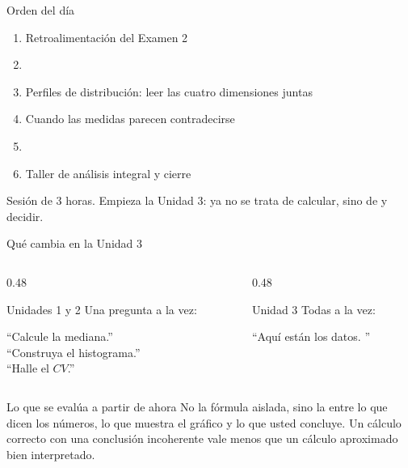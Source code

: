 \documentclass[aspectratio=169,10pt]{beamer}
\begin{document}
\portada

\begin{frame}{Orden del día}
  \begin{enumerate}
    \item Retroalimentación del Examen 2
    \item {}
    \item Perfiles de distribución: leer las cuatro dimensiones juntas
    \item Cuando las medidas parecen contradecirse
    \item {}
    \item Taller de análisis integral y cierre
  \end{enumerate}

  \vspace{0.25cm}
  {\footnotesize\color{uniGris} Sesión de 3 horas. Empieza la Unidad 3: ya no
  se trata de calcular, sino de  y decidir.}
\end{frame}

\begin{frame}{Qué cambia en la Unidad 3}
  \footnotesize
  \begin{columns}[T,onlytextwidth]
    \begin{column}{0.48\textwidth}
      \begin{block}{Unidades 1 y 2}
        \scriptsize
        Una pregunta a la vez:

        ``Calcule la mediana.'' \\
        ``Construya el histograma.'' \\
        ``Halle el $CV$.''
      \end{block}
    \end{column}
    \begin{column}{0.48\textwidth}
      \begin{exampleblock}{Unidad 3}
        \scriptsize
        Todas a la vez:

        ``Aquí están los datos. ''
      \end{exampleblock}
    \end{column}
  \end{columns}

  \vspace{0.2cm}
  \begin{alertblock}{Lo que se evalúa a partir de ahora}
    \footnotesize
    No la fórmula aislada, sino la  entre lo que dicen los
    números, lo que muestra el gráfico y lo que usted concluye. Un cálculo
    correcto con una conclusión incoherente vale menos que un cálculo
    aproximado bien interpretado.
  \end{alertblock}
\end{frame}
\end{document}
